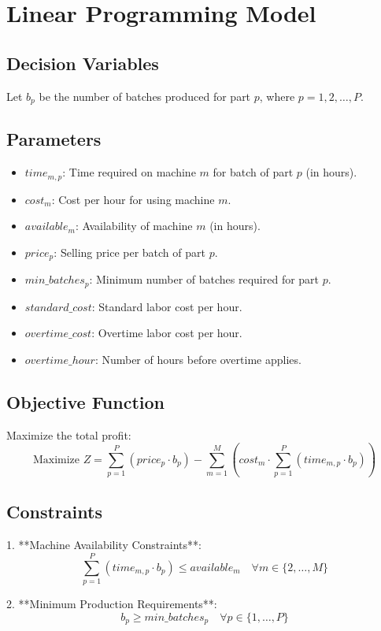 \documentclass{article}
\begin{document}
\section*{Linear Programming Model}

\subsection*{Decision Variables}
Let \( b_p \) be the number of batches produced for part \( p \), where \( p = 1, 2, \ldots, P \).

\subsection*{Parameters}
\begin{itemize}
    \item \( time_{m,p} \): Time required on machine \( m \) for batch of part \( p \) (in hours).
    \item \( cost_{m} \): Cost per hour for using machine \( m \).
    \item \( available_{m} \): Availability of machine \( m \) (in hours).
    \item \( price_{p} \): Selling price per batch of part \( p \).
    \item \( min\_batches_{p} \): Minimum number of batches required for part \( p \).
    \item \( standard\_cost \): Standard labor cost per hour.
    \item \( overtime\_cost \): Overtime labor cost per hour.
    \item \( overtime\_hour \): Number of hours before overtime applies.
\end{itemize}

\subsection*{Objective Function}
Maximize the total profit:
\[
\text{Maximize } Z = \sum_{p=1}^{P} (price_p \cdot b_p) - \sum_{m=1}^{M} (cost_m \cdot \sum_{p=1}^{P} (time_{m,p} \cdot b_p))
\]

\subsection*{Constraints}
1. **Machine Availability Constraints**:
   \[
   \sum_{p=1}^{P} (time_{m,p} \cdot b_p) \leq available_{m} \quad \forall m \in \{2, \ldots, M\}
   \]

2. **Minimum Production Requirements**:
   \[
   b_p \geq min\_batches_p \quad \forall p \in \{1, \ldots, P\}
   \]
\end{document}
